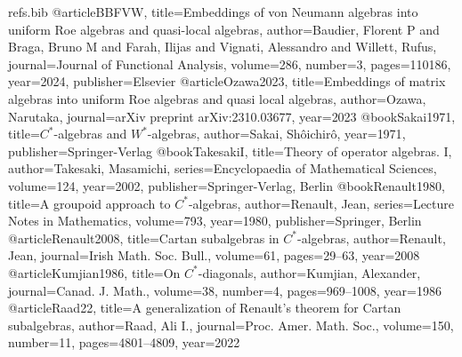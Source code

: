 \begin{filecontents*}{refs.bib}
@article{BBFVW,
  title={Embeddings of von Neumann algebras into uniform Roe algebras and quasi-local algebras},
  author={Baudier, Florent P and Braga, Bruno M and Farah, Ilijas and Vignati, Alessandro and Willett, Rufus},
  journal={Journal of Functional Analysis},
  volume={286},
  number={3},
  pages={110186},
  year={2024},
  publisher={Elsevier}
}
@article{Ozawa2023,
  title={Embeddings of matrix algebras into uniform Roe algebras and quasi local algebras},
  author={Ozawa, Narutaka},
  journal={arXiv preprint arXiv:2310.03677},
  year={2023}
}
@book{Sakai1971,
  title={$C^*$-algebras and $W^*$-algebras},
  author={Sakai, Sh{\^o}ichir{\^o}},
  year={1971},
  publisher={Springer-Verlag}
}
@book{TakesakiI,
  title={Theory of operator algebras. {I}},
  author={Takesaki, Masamichi},
  series={Encyclopaedia of Mathematical Sciences},
  volume={124},
  year={2002},
  publisher={Springer-Verlag, Berlin}
}
@book{Renault1980,
  title={A groupoid approach to $C^*$-algebras},
  author={Renault, Jean},
  series={Lecture Notes in Mathematics},
  volume={793},
  year={1980},
  publisher={Springer, Berlin}
}
@article{Renault2008,
  title={Cartan subalgebras in $C^*$-algebras},
  author={Renault, Jean},
  journal={Irish Math. Soc. Bull.},
  volume={61},
  pages={29--63},
  year={2008}
}
@article{Kumjian1986,
  title={On $C^*$-diagonals},
  author={Kumjian, Alexander},
  journal={Canad. J. Math.},
  volume={38},
  number={4},
  pages={969--1008},
  year={1986}
}
@article{Raad22,
  title={A generalization of Renault's theorem for Cartan subalgebras},
  author={Raad, Ali I.},
  journal={Proc. Amer. Math. Soc.},
  volume={150},
  number={11},
  pages={4801--4809},
  year={2022}
}
\end{filecontents*}

\documentclass{amsart}

\usepackage[utf8]{inputenc}
\usepackage[T1]{fontenc}
\usepackage{amsmath,amssymb,amsthm,mathtools}
\usepackage{enumitem}
\usepackage{comment}
\usepackage{mathrsfs}
\usepackage[colorlinks=true,linkcolor=blue,citecolor=blue,urlcolor=blue]{hyperref}

\newtheorem{theorem}{Theorem}[section]
\newtheorem{proposition}[theorem]{Proposition}
\newtheorem{lemma}[theorem]{Lemma}
\newtheorem{corollary}[theorem]{Corollary}
\theoremstyle{remark}
\newtheorem{remark}[theorem]{Remark}
\newtheorem{question}[theorem]{Question}
\theoremstyle{definition}
\newtheorem{definition}[theorem]{Definition}
\newtheorem{example}[theorem]{Example}


